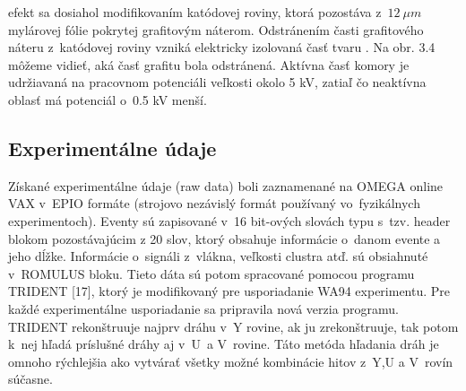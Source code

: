  efekt sa dosiahol modifikovaním katódovej roviny, ktorá
pozostá\-va z~$12\: \mu m$ mylárovej fólie pokrytej grafitovým náterom.
Odstránením časti grafitového náteru z~katódovej roviny vzniká elektricky
izolovaná časť tvaru . Na obr. 3.4 môžeme vidieť, aká časť
grafitu bola odstránená. Aktívna časť komory je udržiavaná na pracovnom
potenciáli veľkosti okolo 5 kV, zatiaľ čo neaktívna oblasť má potenciál 
o~0.5 kV menší. 

\newpage
\subsection{Experimentálne údaje}
Získané experimentálne údaje (raw data)  boli zaznamenané na
OMEGA online VAX  v~EPIO formáte (strojovo nezávislý formát používaný
vo~fyzikálnych experimentoch). Eventy sú zapisované v~16 bit-ových slovách
typu  s~tzv. header blokom pozostávajúcim z  20
slov, ktorý obsahuje informácie o~danom evente a jeho dĺžke. Informácie
o~signáli z~vlákna, veľkosti clustra atď. sú obsiahnuté v~ROMULUS bloku.
Tieto dáta sú potom spracované pomocou programu TRIDENT  [17], ktorý je
modifikovaný pre usporiadanie WA94 experimentu. Pre každé experimentálne
usporiadanie sa pripravila nová verzia programu. TRIDENT rekonštruuje najprv
dráhu v~Y rovine, ak ju zrekonštruuje, tak potom k~nej hľadá príslušné
dráhy aj v~U~a V~rovine. Táto metóda hľadania dráh je omnoho rýchlejšia ako
vytvárať všetky možné kombinácie hitov z~Y,U a V~rovín súčasne. 

